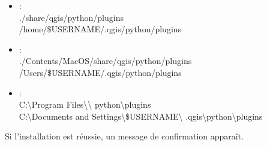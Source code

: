 \begin{itemize}[label=--]
\item {} :\\
./share/qgis/python/plugins \\
/home/\$USERNAME/.qgis/python/plugins
\item {} :\\
./Contents/MacOS/share/qgis/python/plugins \\
/Users/\$USERNAME/.qgis/python/plugins
\item {} :\\
C:\textbackslash Program Files\textbackslash \qg\textbackslash
python\textbackslash plugins \\
C:\textbackslash Documents and Settings\textbackslash\$USERNAME\textbackslash
.qgis\textbackslash python\textbackslash plugins
\end{itemize}

Si l'installation est réussie, un message de confirmation apparaît.



